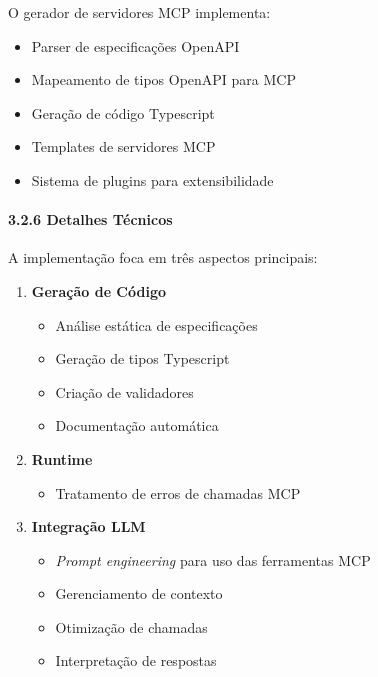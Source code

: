 \documentclass[
]{article}
\providecommand{\tightlist}{%
  \setlength{\itemsep}{0pt}\setlength{\parskip}{0pt}}
\begin{document}
O gerador de servidores MCP implementa:

\begin{itemize}
\tightlist
\item
  Parser de especificações OpenAPI
\item
  Mapeamento de tipos OpenAPI para MCP
\item
  Geração de código Typescript
\item
  Templates de servidores MCP
\item
  Sistema de plugins para extensibilidade
\end{itemize}

\paragraph{3.2.6 Detalhes Técnicos}\label{detalhes-tuxe9cnicos-1}

A implementação foca em três aspectos principais:

\begin{enumerate}
\def\labelenumi{\arabic{enumi}.}
\item
  \textbf{Geração de Código}

  \begin{itemize}
  \tightlist
  \item
    Análise estática de especificações
  \item
    Geração de tipos Typescript
  \item
    Criação de validadores
  \item
    Documentação automática
  \end{itemize}
\item
  \textbf{Runtime}

  \begin{itemize}
  \tightlist
  \item
    Tratamento de erros de chamadas MCP
  \end{itemize}
\item
  \textbf{Integração LLM}

  \begin{itemize}
  \tightlist
  \item
    \emph{Prompt engineering} para uso das ferramentas MCP
  \item
    Gerenciamento de contexto
  \item
    Otimização de chamadas
  \item
    Interpretação de respostas
  \end{itemize}
\end{enumerate}
\end{document}
